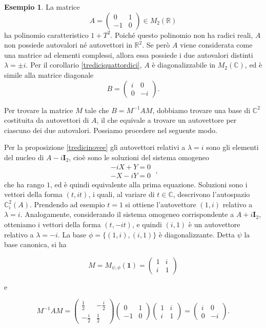 \documentclass{article}
\theoremstyle{plain}
\theoremstyle{definition}
\newtheorem{exmp}{Esempio}[section]
\theoremstyle{remark}
\begin{document}
\vspace{10pt}

\begin{exmp}
La matrice
\[
A = \begin{pmatrix}
0 & 1 \\
-1 & 0
\end{pmatrix} \in M_2(\mathbb{R})
\]
ha polinomio caratteristico $1 + T^2$. Poiché questo polinomio non ha radici reali, $A$ non possiede autovalori né autovettori in $\mathbb{R}^2$. Se però $A$ viene considerata come una matrice ad elementi complessi, allora essa possiede i due autovalori distinti $\lambda = \pm i$.    
Per il corollario \ref{trediciquattordici}, $A$ è diagonalizzabile in $M_2(\mathbb{C})$, ed è simile alla matrice diagonale
\[
B = \begin{pmatrix}
i & 0 \\
0 & -i
\end{pmatrix}.
\]

Per trovare la matrice $M$ tale che $B = M^{-1}AM$, dobbiamo trovare una base di $\mathbb{C}^2$ costituita da autovettori di $A$, il che equivale a trovare un autovettore per ciascuno dei due autovalori. Possiamo procedere nel seguente modo.

Per la proposizione \ref{tredicinovee} gli autovettori relativi a $\lambda = i$ sono gli elementi del nucleo 
di $A - i\mathbf{I}_2$, cioè sono le soluzioni del sistema omogeneo
\[
\begin{matrix}
-iX + Y = 0 \\
-X - iY = 0    
\end{matrix}\;,
\]
che ha rango $1$, ed è quindi equivalente alla prima equazione. 
Soluzioni sono i vettori della forma $(t, it)$, i quali, al variare di $t \in \mathbb{C}$, 
descrivono l'autospazio $\mathbb{C}^2_i(A)$. Prendendo ad esempio $t = 1$ si ottiene l'autovettore $(1, i)$ 
relativo a $\lambda = i$. Analogamente, considerando il sistema omogeneo corrispondente a $A + i\mathbf{I}_2$, 
otteniamo i vettori della forma $(t, -it)$, e quindi $(i,1)$ è un autovettore relativo a $\lambda = -i$. 
La base $\phi = \{(1, i), (i,1)\}$ è diagonalizzante. Detta $\psi$ la base canonica, si ha

\[
M = M_{\psi,\phi}(\mathbf{1}) = \begin{pmatrix}
1 & i \\
i & 1
\end{pmatrix}
\]

e

\[
M^{-1}AM = \begin{pmatrix}
\frac{1}{2} & -\frac{i}{2} \\
-\frac{i}{2} & \frac{1}{2}
\end{pmatrix}
\begin{pmatrix}
0 & 1 \\
-1 & 0
\end{pmatrix}
\begin{pmatrix}
1 & i \\
i & 1
\end{pmatrix}
=
\begin{pmatrix}
i & 0 \\
0 & -i
\end{pmatrix}.
\]
\end{exmp}
\end{document}
